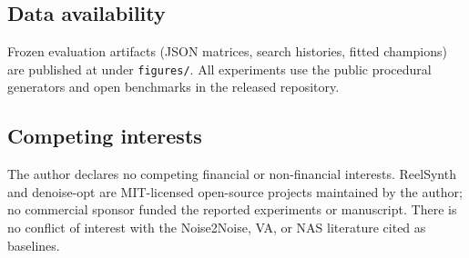 \subsection{Data availability}
\label{sec:data-availability}
Frozen evaluation artifacts (JSON matrices, search histories, fitted champions)
are published at 
under \texttt{figures/}.
All experiments use the public procedural generators and open benchmarks in the released repository.

\subsection{Competing interests}
\label{sec:competing}
The author declares no competing financial or non-financial interests.
ReelSynth and denoise-opt are MIT-licensed open-source projects maintained by the author; no commercial sponsor funded the reported experiments or manuscript.
There is no conflict of interest with the Noise2Noise, VA, or NAS literature cited as baselines.
